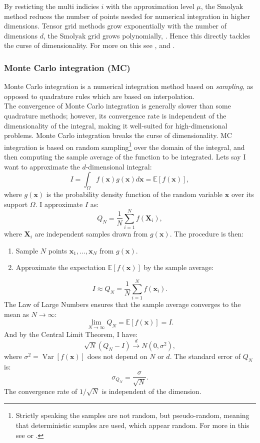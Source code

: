 \documentclass[11pt]{article}
\begin{document}
By resticting the multi indicies \( i \) with the approximation level \( \mu \), the Smolyak method reduces 
the number of points needed for numerical integration in higher dimensions.
Tensor grid methods grow exponentially with the number of dimensions \( d \), the Smolyak grid grows polynomially, \autocite{judd2014smolyak}.
Hence this directly tackles the curse of dimensionality. For more on this see \autocite{smolyak1963}, \autocite{judd2014smolyak} and
\autocite{horneff2016efficient}. 

\subsubsection{Monte Carlo integration (MC)} \label{Subsection: MC}
Monte Carlo integration is a numerical integration method based on \textit{sampling}, as opposed to
quadrature rules which are based on interpolation. \\
The convergence of Monte Carlo integration is generally slower
than some quadrature methods; however, its convergence rate is independent of
the dimensionality of the integral, making it well-suited for high-dimensional problems.
Monte Carlo integration breaks the curse of dimensionality.
\ac{MC} integration is based on random sampling\footnote{Strictly speaking the samples are not random, but pseudo-random, meaning that deterministic samples are used, which appear random. For more in this see \autocite{Judd1998Book} or  \autocite{Glasserman2004MC}.}
over the domain of the integral, and then computing the sample average of the function to be integrated.
Lets say I want to approximate the $d$-dimensional integral:
\begin{equation} \label{eq: MC-integral}
  I = \int_{\Omega} f(\mathbf{x}) g(\mathbf{x}) d\mathbf{x} = \mathbb{E}[f(\mathbf{x})],
\end{equation}
where \( g(\mathbf{x}) \) is the probability density function of the random variable \( \mathbf{x} \) over its support \( \Omega \). I approximate \( I \) as:
\begin{equation} \label{eq: MC-integralapproximation}
  Q_N = \frac{1}{N} \sum_{i=1}^{N} f(\mathbf{X}_i),
\end{equation}
where \( \mathbf{X}_i \) are independent samples drawn from \( g(\mathbf{x}) \).
The procedure is then:
\begin{enumerate}
  \item Sample \( N \) points \( \mathbf{x}_1, \ldots, \mathbf{x}_N \) from \( g(\mathbf{x}) \).
  \item Approximate the expectation \( \mathbb{E}[f(\mathbf{x})] \) by the sample average:
\end{enumerate}
\[
I \approx Q_{N} = \frac{1}{N} \sum_{i=1}^{N} f(\mathbf{x}_{i}).
\]
The Law of Large Numbers ensures that the sample average converges to the mean as \( N \to \infty \):
\[
\lim_{{N \to \infty}} Q_{N} = \mathbb{E}[f(\mathbf{x})] = I.
\]
And by the Central Limit Theorem, I have:
\[
\sqrt{N} \left( Q_N - I \right) \xrightarrow{d} N\left(0, \sigma^2 \right),
\]
where \( \sigma^2 = \operatorname{Var}[f(\mathbf{x})] \) does not depend on \( N \) or \( d \). 
The standard error of \( Q_N \) is:
\[
\sigma_{Q_N} = \frac{\sigma}{\sqrt{N}}.
\]
The convergence rate of \( 1/\sqrt{N} \) is independent of the dimension. 
\end{document}
